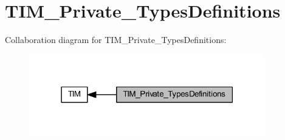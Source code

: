 \hypertarget{group___t_i_m___private___types_definitions}{}\section{T\+I\+M\+\_\+\+Private\+\_\+\+Types\+Definitions}
\label{group___t_i_m___private___types_definitions}
Collaboration diagram for T\+I\+M\+\_\+\+Private\+\_\+\+Types\+Definitions\+:
\nopagebreak
\begin{figure}[H]
\begin{center}
\leavevmode
\includegraphics[width=291pt]{group___t_i_m___private___types_definitions}
\end{center}
\end{figure}
